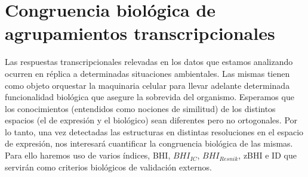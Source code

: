\chapter{Congruencia biológica de agrupamientos transcripcionales}
Las respuestas transcripcionales relevadas en los datos que estamos analizando ocurren en réplica a determinadas situaciones ambientales. Las mismas tienen como objeto orquestar la maquinaria celular para llevar adelante determinada funcionalidad biológica que asegure la sobrevida del organismo. Esperamos que los conocimientos (entendidos como nociones de similitud) de los distintos espacios (el de expresión y el biológico) sean diferentes pero no ortogonales. Por lo tanto, una vez detectadas las estructuras en distintas resoluciones en el espacio de expresión, nos interesará cuantificar la congruencia biológica de las mismas. Para ello haremos uso de varios índices, BHI, $BHI_{IC}$, $BHI_{Resnik}$, zBHI e ID que servirán como criterios biológicos de validación externos.

